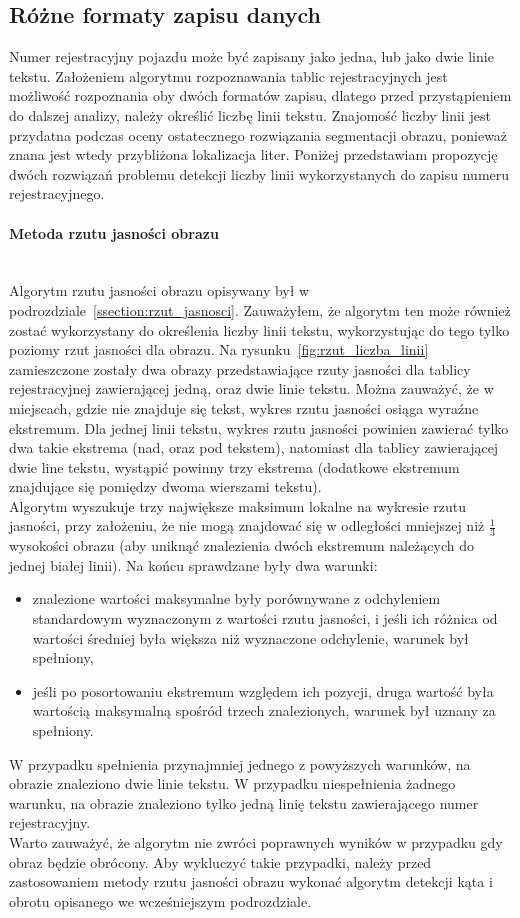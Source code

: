 \subsection{Różne formaty zapisu danych}
Numer rejestracyjny pojazdu może być zapisany jako jedna, lub jako dwie linie tekstu. Założeniem algorytmu rozpoznawania tablic rejestracyjnych jest możliwość rozpoznania oby dwóch formatów zapisu, dlatego przed przystąpieniem do dalszej analizy, należy określić liczbę linii tekstu. Znajomość liczby linii jest przydatna podczas oceny ostatecznego rozwiązania segmentacji obrazu, ponieważ znana jest wtedy przybliżona lokalizacja liter. Poniżej przedstawiam propozycję dwóch rozwiązań problemu detekcji liczby linii wykorzystanych do zapisu numeru rejestracyjnego.
\paragraph{Metoda rzutu jasności obrazu}\mbox{}\\
Algorytm rzutu jasności obrazu opisywany był w podrozdziale~\ref{ssection:rzut_jasnosci}. Zauważyłem, że algorytm ten może również zostać wykorzystany do określenia liczby linii tekstu, wykorzystując do tego tylko poziomy rzut jasności dla obrazu. Na rysunku~\ref{fig:rzut_liczba_linii} zamieszczone zostały dwa obrazy przedstawiające rzuty jasności dla tablicy rejestracyjnej zawierającej jedną, oraz dwie linie tekstu. Można zauważyć, że w miejscach, gdzie nie znajduje się tekst, wykres rzutu jasności osiąga wyraźne ekstremum. Dla jednej linii tekstu, wykres rzutu jasności powinien zawierać tylko dwa takie ekstrema (nad, oraz pod tekstem), natomiast dla tablicy zawierającej dwie line tekstu, wystąpić powinny trzy ekstrema (dodatkowe ekstremum znajdujące się pomiędzy dwoma wierszami tekstu).\\
Algorytm wyszukuje trzy największe maksimum lokalne na wykresie rzutu jasności, przy założeniu, że nie mogą znajdować się w odległości mniejszej niż $\frac{1}{3}$ wysokości obrazu (aby uniknąć znalezienia dwóch ekstremum należących do jednej białej linii). Na końcu sprawdzane były dwa warunki:
\begin{itemize}
  \item znalezione wartości maksymalne były porównywane z odchyleniem standardowym wyznaczonym z wartości rzutu jasności, i jeśli ich różnica od wartości średniej była większa niż wyznaczone odchylenie, warunek był spełniony,
  \item jeśli po posortowaniu ekstremum względem ich pozycji, druga wartość była wartością maksymalną spośród trzech znalezionych, warunek był uznany za spełniony.
\end{itemize}
W przypadku spełnienia przynajmniej jednego z powyższych warunków, na obrazie znaleziono dwie linie tekstu. W przypadku niespełnienia żadnego warunku, na obrazie znaleziono tylko jedną linię tekstu zawierającego numer rejestracyjny. \\
Warto zauważyć, że algorytm nie zwróci poprawnych wyników w przypadku gdy obraz będzie obrócony. Aby wykluczyć takie przypadki, należy przed zastosowaniem metody rzutu jasności obrazu wykonać algorytm detekcji kąta i obrotu opisanego we wcześniejszym podrozdziale.


